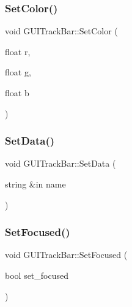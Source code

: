\hypertarget{class_g_u_i_track_bar_a7aa7a25811612e13356d9c5a3951e4df}{}\label{class_g_u_i_track_bar_a7aa7a25811612e13356d9c5a3951e4df} 
\subsubsection{\texorpdfstring{Set\+Color()}{SetColor()}}
{\footnotesize\ttfamily void G\+U\+I\+Track\+Bar\+::\+Set\+Color (\begin{DoxyParamCaption}\item[{float}]{r,  }\item[{float}]{g,  }\item[{float}]{b }\end{DoxyParamCaption})}

\hypertarget{class_g_u_i_track_bar_ab2add0508ebba5aa73a2d1168d402f24}{}\label{class_g_u_i_track_bar_ab2add0508ebba5aa73a2d1168d402f24} 
\subsubsection{\texorpdfstring{Set\+Data()}{SetData()}}
{\footnotesize\ttfamily void G\+U\+I\+Track\+Bar\+::\+Set\+Data (\begin{DoxyParamCaption}\item[{string \&in}]{name }\end{DoxyParamCaption})}

\hypertarget{class_g_u_i_track_bar_afd7e32106ac53e1f56fb140a5dbfb65a}{}\label{class_g_u_i_track_bar_afd7e32106ac53e1f56fb140a5dbfb65a} 
\subsubsection{\texorpdfstring{Set\+Focused()}{SetFocused()}}
{\footnotesize\ttfamily void G\+U\+I\+Track\+Bar\+::\+Set\+Focused (\begin{DoxyParamCaption}\item[{bool}]{set\+\_\+focused }\end{DoxyParamCaption})}

\hypertarget{class_g_u_i_track_bar_ae3e494c81a9fb503417e0b1f5b2547c5}{}\label{class_g_u_i_track_bar_ae3e494c81a9fb503417e0b1f5b2547c5} 
